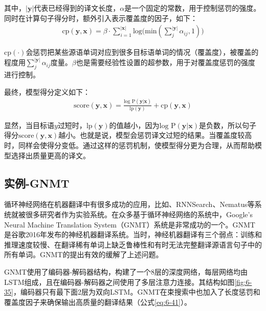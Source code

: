 \noindent 其中，$|\mathbf{y}|$代表已经得到的译文长度，$\alpha$是一个固定的常数，用于控制惩罚的强度。同时在计算句子得分时，额外引入表示覆盖度的因子，如下：
\begin{eqnarray}
\textrm{cp}(\mathbf{y} , \mathbf{x}) = \beta \cdot \sum_{i=1}^{|\mathbf{x}|} \textrm{log} \big(\textrm{min}(\sum_j^{|\mathbf{y}|} \alpha_{ij},1 ) \big)
\label{eq:6-40}
\end{eqnarray}

\noindent $\textrm{cp}(\cdot)$会惩罚把某些源语单词对应到很多目标语单词的情况（覆盖度），被覆盖的程度用$\sum_j^{|\mathbf{y}|} \alpha_{ij}$度量。$\beta$也是需要经验性设置的超参数，用于对覆盖度惩罚的强度进行控制。

\parinterval 最终，模型得分定义如下：
\begin{eqnarray}
\textrm{score} ( \mathbf{y} , \mathbf{x}) = \frac{\textrm{log P}(\mathbf{y} | \mathbf{x})} {\textrm{lp}(\mathbf{y})} + \textrm{cp}(\mathbf{y} , \mathbf{x})
\label{eq:6-41}
\end{eqnarray}

\noindent 显然，当目标语$y$过短时，$\textrm{lp}(\mathbf{y})$的值越小，因为$\textrm{log P}(\mathbf{y} | \mathbf{x})$是负数，所以句子得分$\textrm{score} ( \mathbf{y} , \mathbf{x})$越小。也就是说，模型会惩罚译文过短的结果。当覆盖度较高时，同样会使得分变低。通过这样的惩罚机制，使模型得分更为合理，从而帮助模型选择出质量更高的译文。


\subsection{实例-GNMT}
\vspace{0.5em}

\parinterval 循环神经网络在机器翻译中有很多成功的应用，比如、RNNSearch\cite{bahdanau2014neural}、Nematus\cite{DBLP:journals/corr/SennrichFCBHHJL17}等系统就被很多研究者作为实验系统。在众多基于循环神经网络的系统中，Google's Neural Machine Translation System（GNMT）系统是非常成功的一个\cite{Wu2016GooglesNM}。GNMT是谷歌2016年发布的神经机器翻译系统。当时，神经机器翻译有三个弱点：训练和推理速度较慢、在翻译稀有单词上缺乏鲁棒性和有时无法完整翻译源语言句子中的所有单词。GNMT的提出有效的缓解了上述问题。

\parinterval GNMT使用了编码器-解码器结构，构建了一个8层的深度网络，每层网络均由LSTM组成，且在编码器-解码器之间使用了多层注意力连接。其结构如图\ref{fig:6-35}，编码器只有最下面2层为双向LSTM。GNMT在束搜索中也加入了长度惩罚和覆盖度因子来确保输出高质量的翻译结果（公式\ref{eq:6-41}）。
\vspace{0.5em}

